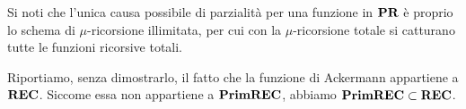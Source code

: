 \documentclass[runningheads,a4paper]{llncs}
\begin{document}
Si noti che l'unica causa possibile di parzialit\`{a} per una funzione in $\mathbf{PR}$ \`{e} proprio lo schema di $\mu$-ricorsione illimitata, per cui con la $\mu$-ricorsione totale si catturano tutte le funzioni ricorsive totali.

Riportiamo, senza dimostrarlo, il fatto che la funzione di Ackermann appartiene a $\mathbf{REC}$. Siccome essa non appartiene a $\mathbf{PrimREC}$, abbiamo $\mathbf{PrimREC} \subset \mathbf{REC}$.

%
\end{document}
